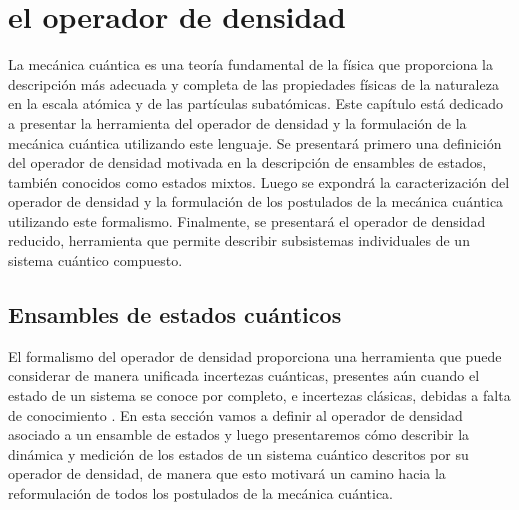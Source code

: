 \chapter{el operador de densidad} %

La mecánica cuántica es una teoría fundamental de la física que
proporciona la descripción más adecuada y completa de las propiedades
físicas de la naturaleza en la escala atómica y de las partículas 
subatómicas. Este capítulo está dedicado a presentar la herramienta
del operador de densidad y la formulación de la mecánica cuántica 
utilizando este lenguaje. Se presentará primero una definición
del operador de densidad motivada en la descripción de ensambles
de estados, también conocidos como estados mixtos. Luego
se expondrá la caracterización del operador de densidad y la 
formulación de los postulados de la mecánica cuántica utilizando este
formalismo. Finalmente, se presentará el 
operador de densidad reducido, herramienta que permite 
describir subsistemas individuales de un sistema cuántico compuesto.

\section{Ensambles de estados cuánticos} %
El formalismo del operador de densidad proporciona una herramienta
que puede considerar de manera unificada incertezas cuánticas, 
presentes aún cuando el estado de un sistema se conoce 
por completo, e incertezas clásicas, 
debidas a falta de conocimiento \cite{sakurai2010modern}.
En esta sección vamos a definir al operador de densidad asociado a 
un ensamble de estados y luego presentaremos cómo describir la dinámica
y medición de los estados de un sistema cuántico descritos por su operador
de densidad, de manera que esto motivará un camino hacia la reformulación
de todos los postulados de la mecánica cuántica.

